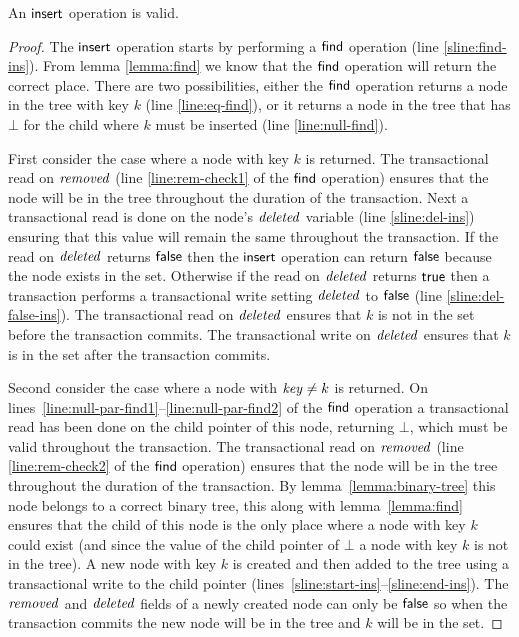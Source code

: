 \begin{theorem}
\label{theorem:insert-valid2}
An $\act{insert}$ operation is valid.
\end{theorem}
\begin{proof}
The $\act{insert}$ operation starts by performing a $\act{find}$ operation (line \ref{sline:find-ins}).
From lemma \ref{lemma:find} we know that the $\act{find}$ operation will return the correct place.
There are two possibilities, either the $\act{find}$ operation returns a node in the tree with key $k$ (line \ref{line:eq-find}),
or it returns a node in the tree that has $\bot$ for the child where $k$ must be inserted (line \ref{line:null-find}).

First consider the case where a node with key $k$ is returned.
The transactional read on $\ms{removed}$ (line \ref{line:rem-check1} of the $\act{find}$ operation) ensures that the node will be in the tree throughout the duration of the transaction.
Next a transactional read is done on the node's $\ms{deleted}$ variable (line \ref{sline:del-ins}) ensuring that this value will remain the same throughout the transaction.
If the read on $\ms{deleted}$ returns $\lit{false}$ then the $\act{insert}$ operation can return $\lit{false}$ because the node exists in the set.
Otherwise if the read on $\ms{deleted}$ returns $\lit{true}$ then a transaction performs a transactional write setting $\ms{deleted}$ to $\lit{false}$ (line \ref{sline:del-false-ins}).
The transactional read on $\ms{deleted}$ ensures that $k$ is not in the set before the transaction commits.
The transactional write on $\ms{deleted}$ ensures that $k$ is in the set after the transaction commits.

Second consider the case where a node with $\ms{key} \neq k$ is returned.
On lines~\ref{line:null-par-find1}--\ref{line:null-par-find2} of the $\act{find}$ operation a transactional read has been done on the child pointer of this node, returning $\bot$, which must be valid throughout the transaction.
The transactional read on $\ms{removed}$ (line \ref{line:rem-check2} of the $\act{find}$ operation) ensures that the node will be in the tree throughout the duration of the transaction.
By lemma~\ref{lemma:binary-tree} this node belongs to a correct binary tree, this along with lemma~\ref{lemma:find} ensures that the child of this node is the only place where a node with key $k$ could exist
(and since the value of the child pointer of $\bot$ a node with key $k$ is not in the tree).
A new node with key $k$ is created and then added to the tree using a transactional write to the child pointer (lines~\ref{sline:start-ins}--\ref{sline:end-ins}).
The $\ms{removed}$ and $\ms{deleted}$ fields of a newly created node can only be $\lit{false}$ so when the transaction commits the new node will be in the tree and $k$ will be in the set.
\end{proof}


